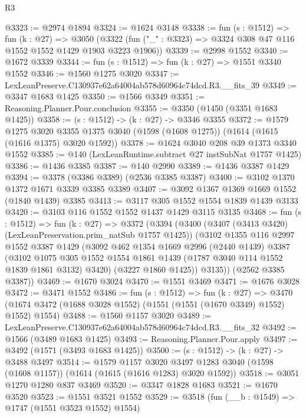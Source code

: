 \begin{lexlean}{R3}
\begin{coremodule}
@3323 := @2974 @1894
@3324 := @1624 @3148
@3338 := fun (s : @1512) =>
  fun (k : @27) =>
  @3050 (@3322 (fun ("_" : @3323) => @3324 @308 @47 @116 @1552 @1552 @1429 @1903 @3223 @1906))
@3339 := @2998 @1552
@3340 := @1672 @3339
@3344 := fun (s : @1512) => fun (k : @27) => @1551 @3340 @1552
@3346 := @1560 @1275 @3020
@3347 := LexLeanPreserve.C130937e62a64004ab578d60964c74dcd.R3.__fits_39
@3349 := @3347 @1683 @1425
@3350 := @1566 @3349
@3351 := Reasoning.Planner.Pour.conclusion
@3355 := @3350 (@1450 (@3351 @1683 @1425))
@3358 := (s : @1512) -> (k : @27) -> @3346 @3355
@3372 := @1579
    @1275
    @3020
    @3355
    @1375
    @3040
    (@1598 (@1608 @1275))
    (@1614 (@1615 (@1616 @1375) @3020 @1592))
@3378 := @1624 @3040 @208 @39 @1373 @3340 @1552
@3385 := @140 (LexLeanRuntime.subtract @27 instSubNat @1757 @1425)
@3386 := @1436 @3385
@3387 := @140 @2990
@3389 := @1436 @3387 @1429
@3394 := @3378 (@3386 @3389) (@2536 @3385 @3387)
@3400 := @3102 @1370 @1372 @1671 @3339 @3385 @3389
@3407 := @3092 @1367 @1369 @1669 @1552 (@1840 @1439) @3385
@3413 := @3117 @305 @1552 @1554 @1839 @1439 @3133
@3420 := @3103 @116 @1552 @1552 @1437 @1429 @3115 @3135
@3468 := fun (s : @1512) =>
  fun (k : @27) =>
  @3372
    (@3394
      (@3400
        (@3407 (@3413 @3420) (LexLeanPreservation.prim_natSub @1757 @1425))
        (@3102
          @1355
          @116
          @2997
          @1552
          @3387
          @1429
          (@3092
            @462
            @1354
            @1669
            @2996
            (@2440 @1439)
            @3387
            (@3102
              @1075
              @305
              @1552
              @1554
              @1861
              @1439
              (@1787 @3040 @114 @1552 @1839 @1861 @3132)
              @3420)
            (@3227 @1860 @1425))
          @3135))
      (@2562 @3385 @3387))
@3469 := @1670 @3024
@3470 := @1551 @3469
@3471 := @1676 @3028
@3472 := @3471 @1552
@3486 := fun (s : @1512) =>
  fun (k : @27) =>
  @3470 (@1674 @3472 (@1688 @3028 @1552) (@1551 (@1551 (@1670 @3349) @1552) @1552) @1554)
@3488 := @1560 @1157 @3020
@3489 := LexLeanPreserve.C130937e62a64004ab578d60964c74dcd.R3.__fits_32
@3492 := @1566 (@3489 @1683 @1425)
@3493 := Reasoning.Planner.Pour.apply
@3497 := @3492 (@1571 (@3493 @1683 @1425))
@3500 := (s : @1512) -> (k : @27) -> @3488 @3497
@3514 := @1579
    @1157
    @3020
    @3497
    @1283
    @3040
    (@1598 (@1608 @1157))
    (@1614 (@1615 (@1616 @1283) @3020 @1592))
@3518 := @3051 @1270 @1280 @837 @3469
@3520 := @3347 @1828 @1683
@3521 := @1670 @3520
@3523 := @1551 @3521 @1552
@3529 := @3518 (fun (__b : @1549) => @1747 (@1551 @3523 @1552) @1554)

\end{coremodule}
\end{lexlean}
